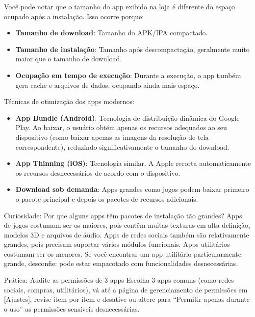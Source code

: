 
Você pode notar que o tamanho do app exibido na loja é diferente do espaço ocupado após a instalação. Isso ocorre porque:

\begin{itemize}
  \item \textbf{Tamanho de download}: Tamanho do APK/IPA compactado.
  \item \textbf{Tamanho de instalação}: Tamanho após descompactação, geralmente muito maior que o tamanho de download.
  \item \textbf{Ocupação em tempo de execução}: Durante a execução, o app também gera cache e arquivos de dados, ocupando ainda mais espaço.
\end{itemize}

Técnicas de otimização dos apps modernos:

\begin{itemize}
  \item \textbf{App Bundle (Android)}: Tecnologia de distribuição dinâmica do Google Play. Ao baixar, o usuário obtém apenas os recursos adequados ao seu dispositivo (como baixar apenas as imagens da resolução de tela correspondente), reduzindo significativamente o tamanho do download.
  \item \textbf{App Thinning (iOS)}: Tecnologia similar. A Apple recorta automaticamente os recursos desnecessários de acordo com o dispositivo.
  \item \textbf{Download sob demanda}: Apps grandes como jogos podem baixar primeiro o pacote principal e depois os pacotes de recursos adicionais.
\end{itemize}

\begin{tcbinfo}{Curiosidade: Por que alguns apps têm pacotes de instalação tão grandes?}
Apps de jogos costumam ser os maiores, pois contêm muitas texturas em alta definição, modelos 3D e arquivos de áudio. Apps de redes sociais também são relativamente grandes, pois precisam suportar vários módulos funcionais. Apps utilitários costumam ser os menores. Se você encontrar um app utilitário particularmente grande, desconfie: pode estar empacotado com funcionalidades desnecessárias.

\end{tcbinfo}

\begin{tcbpractice}{Prática: Audite as permissões de 3 apps}
Escolha 3 apps comuns (como redes sociais, compras, utilitários), vá até a página de gerenciamento de permissões em [Ajustes], revise item por item e desative ou altere para “Permitir apenas durante o uso” as permissões sensíveis desnecessárias.

\end{tcbpractice}
